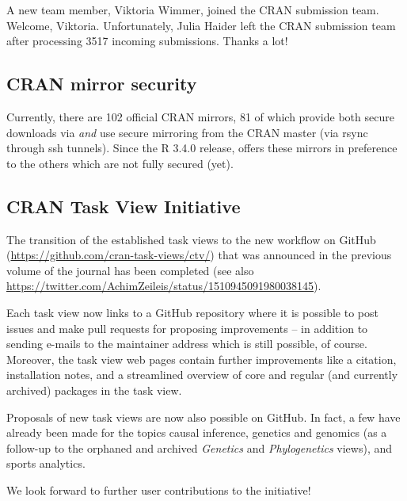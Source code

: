 A new team member, Viktoria Wimmer, joined the CRAN submission team. 
Welcome, Viktoria.
Unfortunately, Julia Haider left the CRAN submission team after 
processing 3517 incoming submissions. Thanks a lot!

\subsection{CRAN mirror security}


Currently, there are 102 official CRAN mirrors, 81 of which provide both
secure downloads via  \emph{and} use secure mirroring from
the CRAN master (via rsync through ssh tunnels).  Since the R 3.4.0
release,  offers these mirrors in preference to
the others which are not fully secured (yet).

\subsection{CRAN Task View Initiative}

The transition of the established task views to the new workflow on
GitHub (\url{https://github.com/cran-task-views/ctv/}) that was
announced in the previous volume of the journal has been completed (see
also \url{https://twitter.com/AchimZeileis/status/1510945091980038145}).

Each task view now links to a GitHub repository where it is possible to
post issues and make pull requests for proposing improvements -- in
addition to sending e-mails to the maintainer address which is still
possible, of course.  Moreover, the task view web pages contain further
improvements like a citation, installation notes, and a streamlined
overview of core and regular (and currently archived) packages in the
task view.

Proposals of new task views are now also possible on GitHub. In fact, a 
few have already been made for the topics causal inference, genetics and 
genomics (as a follow-up to the orphaned and archived \emph{Genetics} and 
\emph{Phylogenetics} views), and sports analytics.

We look forward to further user contributions to the initiative!


\address{Kurt Hornik \\
  WU Wirtschaftsuniversit\"at Wien, Austria \\
  }

\address{Uwe Ligges \\
  TU Dortmund, Germany \\
  }

\address{Achim Zeileis \\
  Universit\"at Innsbruck, Austria \\
  }


